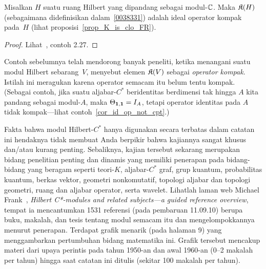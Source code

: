 \begin{exam}\label{0038341} Misalkan $H$ suatu ruang Hilbert yang dipandang sebagai modul-$\mathbb{C}$. Maka
$\mathfrak{K}(H)$ (sebagaimana didefinisikan dalam~\ref{0038331}) adalah ideal operator kompak pada~$H$ (lihat
proposisi~\ref{prop_K_is_clo_FR}).
\end{exam}

\begin{proof} Lihat~\cite{RaeburnW:1998}, contoh 2.27. \ns \end{proof}

Contoh sebelumnya telah mendorong banyak peneliti, ketika menangani suatu modul Hilbert sebarang~$V$,
menyebut elemen $\mathfrak{K}(V)$ sebagai \emph{operator kompak}. Istilah ini
meragukan karena operator semacam itu belum tentu kompak. (Sebagai contoh, jika
suatu aljabar-$C^*$ beridentitas berdimensi tak hingga $A$ kita pandang sebagai modul-$A$, maka
$\Theta_{\mathbf{1},\mathbf{1}} = I_A$, tetapi operator identitas pada $A$ tidak kompak---lihat
contoh~\ref{cor_id_op_not_cpt}.)

Fakta bahwa modul Hilbert-$C^*$ hanya digunakan secara terbatas dalam catatan ini hendaknya
tidak membuat Anda berpikir bahwa kajiannya sangat khusus dan/atau kurang penting.
Sebaliknya,
kajian tersebut sekarang merupakan bidang penelitian penting dan dinamis yang memiliki penerapan
pada bidang-bidang yang beragam seperti teori-$K$, aljabar-$C^*$ graf, grup kuantum, probabilitas
kuantum, berkas vektor, geometri nonkomutatif, topologi aljabar dan topologi geometri,
ruang dan aljabar operator, serta wavelet. Lihatlah
laman web Michael Frank~\cite{Frank:2010}, \emph{Hilbert C*-modules and related subjects---a guided
reference overview}, tempat ia mencantumkan 1531 referensi (pada pembaruan 11.09.10) berupa buku,
makalah, dan tesis tentang modul semacam itu dan mengelompokkannya menurut penerapan. Terdapat
grafik menarik (pada halaman 9) yang menggambarkan pertumbuhan bidang
matematika ini. Grafik tersebut mencakup materi dari upaya perintis pada tahun 1950-an dan awal 1960-an
(0--2 makalah per tahun) hingga saat catatan ini ditulis (sekitar 100 makalah per tahun).
































